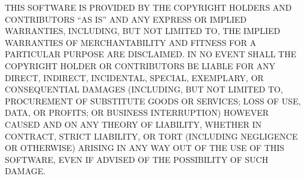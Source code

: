 \documentclass[\docopts]{\docclass}
\begin{document}
THIS SOFTWARE IS PROVIDED BY THE COPYRIGHT HOLDERS AND CONTRIBUTORS ``AS IS''
AND ANY EXPRESS OR IMPLIED WARRANTIES, INCLUDING, BUT NOT LIMITED TO, THE
IMPLIED WARRANTIES OF MERCHANTABILITY AND FITNESS FOR A PARTICULAR PURPOSE ARE
DISCLAIMED. IN NO EVENT SHALL THE COPYRIGHT HOLDER OR CONTRIBUTORS BE LIABLE
FOR ANY DIRECT, INDIRECT, INCIDENTAL, SPECIAL, EXEMPLARY, OR CONSEQUENTIAL
DAMAGES (INCLUDING, BUT NOT LIMITED TO, PROCUREMENT OF SUBSTITUTE GOODS OR
SERVICES; LOSS OF USE, DATA, OR PROFITS; OR BUSINESS INTERRUPTION) HOWEVER
CAUSED AND ON ANY THEORY OF LIABILITY, WHETHER IN CONTRACT, STRICT LIABILITY,
OR TORT (INCLUDING NEGLIGENCE OR OTHERWISE) ARISING IN ANY WAY OUT OF THE USE
OF THIS SOFTWARE, EVEN IF ADVISED OF THE POSSIBILITY OF SUCH DAMAGE.







\end{document}
